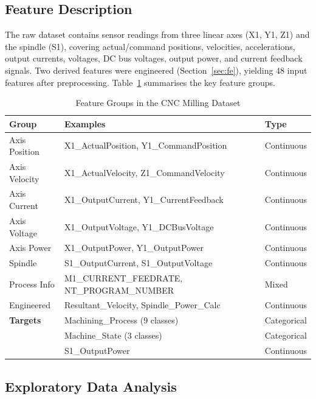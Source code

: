 \documentclass[conference]{IEEEtran}
\begin{document}
\subsection{Feature Description}

The raw dataset contains sensor readings from three linear axes (X1, Y1, Z1) and the
spindle (S1), covering actual/command positions, velocities, accelerations, output
currents, voltages, DC bus voltages, output power, and current feedback signals. Two
derived features were engineered (Section~\ref{sec:fe}), yielding 48 input features
after preprocessing. Table~\ref{tab:features} summarises the key feature groups.

\begin{table}[h]
\caption{Feature Groups in the CNC Milling Dataset}
\label{tab:features}
\centering
\begin{tabular}{lll}
\toprule
\textbf{Group} & \textbf{Examples} & \textbf{Type} \\
\midrule
Axis Position   & X1\_ActualPosition, Y1\_CommandPosition  & Continuous \\
Axis Velocity   & X1\_ActualVelocity, Z1\_CommandVelocity  & Continuous \\
Axis Current    & X1\_OutputCurrent, Y1\_CurrentFeedback   & Continuous \\
Axis Voltage    & X1\_OutputVoltage, Y1\_DCBusVoltage      & Continuous \\
Axis Power      & X1\_OutputPower, Y1\_OutputPower         & Continuous \\
Spindle         & S1\_OutputCurrent, S1\_OutputVoltage     & Continuous \\
Process Info    & M1\_CURRENT\_FEEDRATE, NT\_PROGRAM\_NUMBER & Mixed \\
Engineered      & Resultant\_Velocity, Spindle\_Power\_Calc & Continuous \\
\midrule
\textbf{Targets} & Machining\_Process (9 classes) & Categorical \\
                 & Machine\_State (3 classes)      & Categorical \\
                 & S1\_OutputPower                 & Continuous \\
\bottomrule
\end{tabular}
\end{table}

\subsection{Exploratory Data Analysis}
\end{document}
